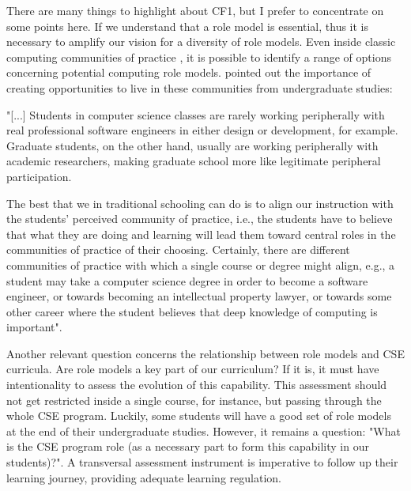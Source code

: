 There are many things to highlight about \gls{CF}1, but I prefer to concentrate on some points here. If we understand that a role model is essential, thus it is necessary to amplify our vision for a diversity of role models. Even inside classic computing communities of practice \cite{wenger:2002}, it is possible to identify a range of options concerning potential computing role models.  pointed out the importance of creating opportunities to live in these communities from undergraduate studies:
\begin{citacao}
    "[...] Students in computer science classes are rarely working peripherally with real professional software engineers in either design or development, for example. Graduate students, on the other hand, usually are working peripherally with academic researchers, making graduate school more like legitimate peripheral participation.
    
    The best that we in traditional schooling can do is to align our instruction with the students’ perceived community of practice, i.e., the students have to believe that what they are doing and learning will lead them toward central roles in the communities of practice of their choosing. Certainly, there are different communities of practice with which a single course or degree might align, e.g., a student may take a computer science degree in order to become a software engineer, or towards becoming an intellectual property lawyer, or towards some other career where the student believes that deep knowledge of computing is important".
\end{citacao}

Another relevant question concerns the relationship between role models and \gls{CSE} curricula. Are role models a key part of our curriculum? If it is, it must have intentionality to assess the evolution of this capability. This assessment should not get restricted inside a single course, for instance, but passing through the whole \gls{CSE} program. Luckily, some students will have a good set of role models at the end of their undergraduate studies. However, it remains a question: "What is the \gls{CSE} program role (as a necessary part to form this capability in our students)?". A transversal assessment instrument is imperative to follow up their learning journey, providing adequate learning regulation. 

